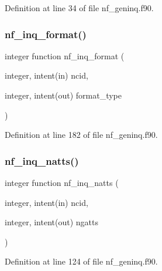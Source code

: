 Definition at line 34 of file nf\+\_\+geninq.\+f90.

\mbox{\label{nf__geninq_8f90_acaf45fd42a6db8c61cb8e97f3837cadf}} 
\subsubsection{\texorpdfstring{nf\+\_\+inq\+\_\+format()}{nf\_inq\_format()}}
{\footnotesize\ttfamily integer function nf\+\_\+inq\+\_\+format (\begin{DoxyParamCaption}\item[{integer, intent(in)}]{ncid,  }\item[{integer, intent(out)}]{format\+\_\+type }\end{DoxyParamCaption})}



Definition at line 182 of file nf\+\_\+geninq.\+f90.

\mbox{\label{nf__geninq_8f90_a3b1a80b287fe67a26928a72ad829e69e}} 
\subsubsection{\texorpdfstring{nf\+\_\+inq\+\_\+natts()}{nf\_inq\_natts()}}
{\footnotesize\ttfamily integer function nf\+\_\+inq\+\_\+natts (\begin{DoxyParamCaption}\item[{integer, intent(in)}]{ncid,  }\item[{integer, intent(out)}]{ngatts }\end{DoxyParamCaption})}



Definition at line 124 of file nf\+\_\+geninq.\+f90.

\mbox{\label{nf__geninq_8f90_adaff99094ef0a89a11d5c123fb81c44c}} 
